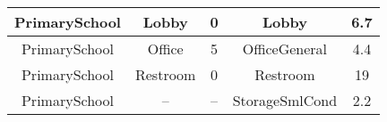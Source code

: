 \begin{table}
\begin{tabular}{|c|c|c|c|c|}
PrimarySchool          & Lobby                   & 0                                                                                                             & Lobby                    & 6.7                                                                                                            \\ \hline
PrimarySchool          & Office                  & 5                                                                                                             & OfficeGeneral            & 4.4                                                                                                            \\ \hline
PrimarySchool          & Restroom                & 0                                                                                                             & Restroom                 & 19                                                                                                             \\ \hline
PrimarySchool          & --                      & --                                                                                                            & StorageSmlCond           & 2.2                                                                                                            \\ \hline
\end{tabular}
\end{table}